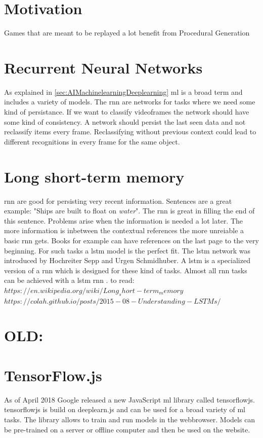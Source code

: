 \documentclass[10pt,a4paper]{article}
\begin{document}
\section{Motivation}
Games that are meant to be replayed a lot benefit from Procedural Generation

\section{Recurrent Neural Networks}
As explained in \autoref{sec:AIMachinelearningDeeplearning} \gls{ml} is a broad term and includes a variety of models. The \gls{rnn} are networks for tasks where we need some kind of persistance. If we want to classify videoframes the network should have some kind of consistency.\cite{Olah2015} A network should persist the last seen data and not reclassify items every frame. Reclassifying without previous context could lead to different recognitions in every frame for the same object.

\section{Long short-term memory}
\gls{rnn} are good for persisting very recent information. Sentences are a great example: "Ships are built to float on \textit{water}". The \gls{rnn} is great in filling the end of this sentence. Problems arise when the information is needed a lot later. The more information is inbetween the contextual references the more unreiable a basic \gls{rnn} gets. Books for example can have references on the last page to the very beginning. For such tasks a \gls{lstm} model is the perfect fit. The \gls{lstm} network was introduced by Hochreiter Sepp and Urgen Schmidhuber\citep{Hochreiter1997}. A \gls{lstm} is a specialized version of a \gls{rnn} which is designed for these kind of tasks. Almost all \gls{rnn} tasks can be achieved with a \gls{lstm} \gls{rnn} \cite{Olah2015}. 
to read: $https://en.wikipedia.org/wiki/Long_short-term_memory$
$https://colah.github.io/posts/2015-08-Understanding-LSTMs/$



\section{OLD:}
\section{TensorFlow.js}
As of April 2018 Google released a new JavaScript \gls{ml} library called \gls{tensorflowjs}. \gls{tensorflowjs} is build on deeplearn.js and can be used for a broad variety of \gls{ml} tasks. The library allows to train and run models in the webbrowser. Models can be pre-trained on a server or offline computer and then be used on the website.
\end{document}
